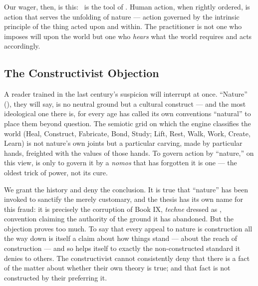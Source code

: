 Our wager, then, is this: \praxis\ is the tool of \physis. Human action, when
rightly ordered, is action that serves the unfolding of nature --- action
governed by the intrinsic principle of the thing acted upon and within. The
practitioner is not one who imposes will upon the world but one who \emph{hears}
what the world requires and acts accordingly.

\subsection{The Constructivist Objection}

A reader trained in the last century's suspicion will interrupt at once. ``Nature''
(\physis), they will say, is no neutral ground but a cultural construct --- and the
most ideological one there is, for every age has called its own conventions
``natural'' to place them beyond question. The semiotic grid on which the engine
classifies the world (Heal, Construct, Fabricate, Bond, Study; Lift, Rest, Walk,
Work, Create, Learn) is not nature's own joints but a particular carving, made by
particular hands, freighted with the values of those hands. To govern action by
``nature,'' on this view, is only to govern it by a \emph{nomos} that has
forgotten it is one --- the oldest trick of power, not its cure.

We grant the history and deny the conclusion. It is true that ``nature'' has been
invoked to sanctify the merely customary, and the thesis has its own name for this
fraud: it is precisely the corruption of Book IX, \emph{techne} dressed as
\physis, convention claiming the authority of the ground it has abandoned. But the
objection proves too much. To say that every appeal to nature is construction all
the way down is itself a claim about how things stand --- about the reach of
construction --- and so helps itself to exactly the non-constructed standard it
denies to others. The constructivist cannot consistently deny that there is a fact
of the matter about whether their own theory is true; and that fact is not
constructed by their preferring it.

